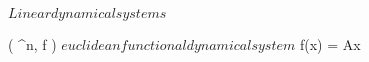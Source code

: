 \documentclass[../Main/main]{subfiles}
\begin{document}
\unit{ $ Linear dynamical systems $ }
{
	
	{
		{
			( \R^n, f ) $ euclidean functional dynamical system $
		}
		{
			{
				{
					f(x) = Ax
				}
			}
		}
	}
}


\end{document}
